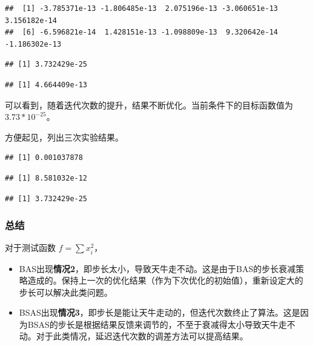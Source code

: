 \documentclass[]{ctexbook}
\newenvironment{Shaded}{\begin{snugshade}}{\end{snugshade}}
\newcommand{\OperatorTok}[1]{\textcolor[rgb]{0.81,0.36,0.00}{\textbf{#1}}}
\newcommand{\NormalTok}[1]{#1}
\providecommand{\tightlist}{%
  \setlength{\itemsep}{0pt}\setlength{\parskip}{0pt}}
\begin{document}
\begin{verbatim}
##  [1] -3.785371e-13 -1.806485e-13  2.075196e-13 -3.060651e-13  3.156182e-14
##  [6] -6.596821e-14  1.428151e-13 -1.098809e-13  9.320642e-14 -1.186302e-13
\end{verbatim}

\begin{verbatim}
## [1] 3.732429e-25
\end{verbatim}

\begin{verbatim}
## [1] 4.664409e-13
\end{verbatim}

可以看到，随着迭代次数的提升，结果不断优化。当前条件下的目标函数值为\(3.73*10^{-25}\)。

方便起见，列出三次实验结果。

\begin{Shaded}
\end{Shaded}

\begin{verbatim}
## [1] 0.001037878
\end{verbatim}

\begin{verbatim}
## [1] 8.581032e-12
\end{verbatim}

\begin{verbatim}
## [1] 3.732429e-25
\end{verbatim}

\subsubsection{总结}\label{-3}

对于测试函数 \(f = \sum x_i^2\)，

\begin{itemize}
\tightlist
\item
  BAS出现\textbf{情况2}，即步长太小，导致天牛走不动。这是由于BAS的步长衰减策略造成的。保持上一次的优化结果（作为下次优化的初始值），重新设定大的步长可以解决此类问题。
\item
  BSAS出现\textbf{情况3}，即步长是能让天牛走动的，但迭代次数终止了算法。这是因为BSAS的步长是根据结果反馈来调节的，不至于衰减得太小导致天牛走不动。对于此类情况，延迟迭代次数的调差方法可以提高结果。
\end{itemize}
\end{document}
